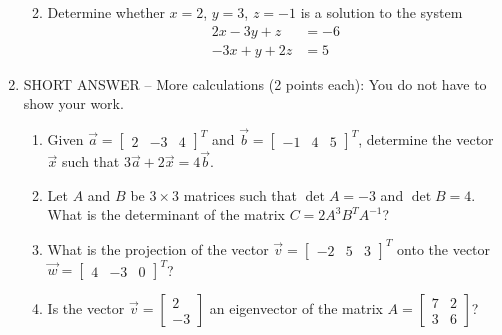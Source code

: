 \documentclass[12pt]{article}
\begin{document}
\begin{enumerate}
\begin{enumerate}
\vspace{1.75in}

 \item Determine whether $x=2$, $y=3$, $z=-1$ is a solution to the system
\begin{align*}
 2x-3y+z&=-6\\
 -3x+y+2z&=5
\end{align*}

\end{enumerate}
\newpage

\item SHORT ANSWER -- More calculations (2 points each): You do not have to show your work.

\begin{enumerate}
 \item Given $\vec{a} = \begin{bmatrix}2&-3&4\end{bmatrix}^T$ and $\vec{b}=\begin{bmatrix}-1&4&5\end{bmatrix}^T$, determine the vector $\vec{x}$ such that $3\vec{a}+2\vec{x} = 4\vec{b}$.

\vspace{1.75in}

 \item Let $A$ and $B$ be $3\times 3$ matrices such that $\det A = -3$ and $\det B = 4$. What is the determinant of the matrix $C=2A^3B^TA^{-1}$?

\vspace{1.75in}

 \item What is the projection of the vector $\vec{v}=\begin{bmatrix}-2&5&3\end{bmatrix}^T$ onto the vector $\vec{w} = \begin{bmatrix}4&-3&0\end{bmatrix}^T$?

\vspace{1.75in}

 \item Is the vector $\vec{v} = \begin{bmatrix}2\\-3\end{bmatrix}$ an eigenvector of the matrix $A=\begin{bmatrix}7&2\\3&6\end{bmatrix}$?
\end{enumerate}
\newpage


\end{enumerate}
\end{document}
